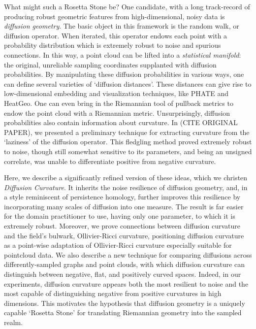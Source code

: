 \documentclass[
  letterpaper,
  DIV=11,
  numbers=noendperiod]{scrartcl}
\theoremstyle{plain}
\theoremstyle{definition}
\theoremstyle{plain}
\theoremstyle{definition}
\theoremstyle{plain}
\theoremstyle{remark}
\begin{document}
What might such a Rosetta Stone be? One candidate, with a long
track-record of producing robust geometric features from
high-dimensional, noisy data is \emph{diffusion geometry}. The basic
object in this framework is the random walk, or diffusion operator. When
iterated, this operator endows each point with a probability
distribution which is extremely robust to noise and spurious
connections. In this way, a point cloud can be lifted into a
\emph{statistical manifold}: the original, unreliable sampling
coordinates supplanted with diffusion probabilities. By manipulating
these diffusion probabilities in various ways, one can define several
varieties of `diffusion distances'. These distances can give rise to
low-dimensional embedding and visualization techniques, like PHATE and
HeatGeo. One can even bring in the Riemannian tool of pullback metrics
to endow the point cloud with a Riemannian metric. Unsurprisingly,
diffusion probabilities also contain information about curvature. In
(CITE ORIGINAL PAPER), we presented a preliminary technique for
extracting curvature from the `laziness' of the diffusion operator. This
fledgling method proved extremely robust to noise, though still somewhat
sensitive to its parameters, and being an unsigned correlate, was unable
to differentiate positive from negative curvature.

Here, we describe a significantly refined version of these ideas, which
we christen \emph{Diffusion Curvature}. It inherits the noise resilience
of diffusion geometry, and, in a style reminiscent of persistence
homology, further improves this resilience by incorporating many scales
of diffusion into one measure. The result is far easier for the domain
practitioner to use, having only one parameter, to which it is extremely
robust. Moreover, we prove connections between diffusion curvature and
the field's bulwark, Ollivier-Ricci curvature, positioning diffusion
curvature as a point-wise adaptation of Ollivier-Ricci curvature
especially suitable for pointcloud data. We also describe a new
technique for comparing diffusions across differently-sampled graphs and
point clouds, with which diffusion curvature can distinguish between
negative, flat, and positively curved spaces. Indeed, in our
experiments, diffusion curvature appears both the most resilient to
noise and the most capable of distinguishing negative from positive
curvatures in high dimensions. This motivates the hypothesis that
diffusion geometry is a uniquely capable `Rosetta Stone' for translating
Riemannian geometry into the sampled realm.
\end{document}
